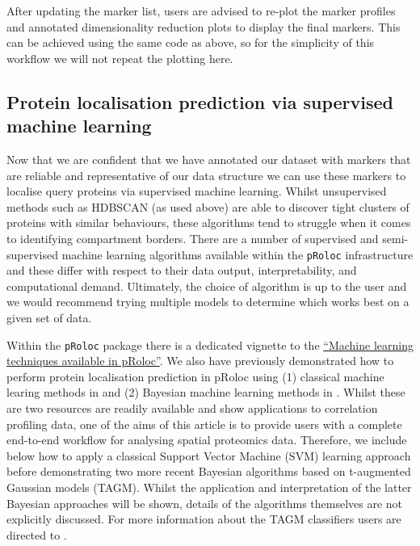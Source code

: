 \documentclass[9pt,a4paper,]{extarticle}
\begin{document}
After updating the marker list, users are advised to re-plot the marker profiles
and annotated dimensionality reduction plots to display the final markers. This
can be achieved using the same code as above, so for the simplicity of this
workflow we will not repeat the plotting here.

\subsection{Protein localisation prediction via supervised machine learning}\label{protein-localisation-prediction-via-supervised-machine-learning}

Now that we are confident that we have annotated our dataset with markers that
are reliable and representative of our data structure we can use these markers
to localise query proteins via supervised machine learning. Whilst unsupervised
methods such as HDBSCAN (as used above) are able to discover tight clusters of
proteins with similar behaviours, these algorithms tend to struggle when it
comes to identifying compartment borders. There are a number of supervised and
semi-supervised machine learning algorithms available within the \texttt{pRoloc}
infrastructure and these differ with respect to their data output,
interpretability, and computational demand. Ultimately, the choice of algorithm
is up to the user and we would recommend trying multiple models to determine
which works best on a given set of data.

Within the \texttt{pRoloc} package there is a dedicated vignette to the
\href{https://bioconductor.org/packages/release/bioc/html/pRoloc.html}{``Machine learning techniques available in pRoloc''}. We
also have previously demonstrated how to perform protein localisation prediction
in pRoloc using (1) classical machine learing methods in \citet{Breckels2018} and (2)
Bayesian machine learning methods in \citet{Crook2019}. Whilst these are two resources
are readily available and show applications to correlation profiling data, one of
the aims of this article is to provide users with a complete end-to-end workflow
for analysing spatial proteomics data. Therefore, we include below how to apply
a classical Support Vector Machine (SVM) learning approach before demonstrating
two more recent Bayesian algorithms based on t-augmented Gaussian models (TAGM).
Whilst the application and interpretation of the latter Bayesian approaches will
be shown, details of the algorithms themselves are not explicitly discussed. For
more information about the TAGM classifiers users are directed to \citep{Crook2018, Crook2019}.
\end{document}

